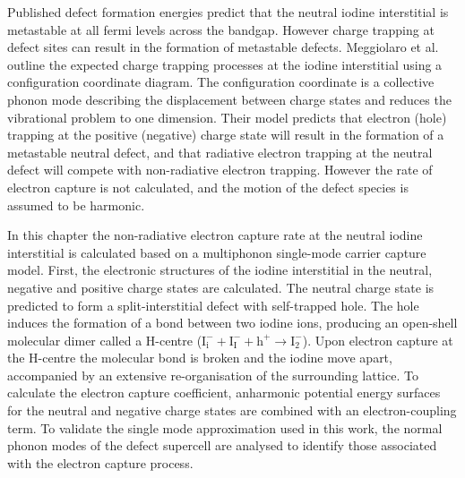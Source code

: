 Published defect formation energies predict that the neutral iodine interstitial is metastable at all fermi levels across the bandgap.\autocite{Du2015,Meggiolaro2018}
However charge trapping at defect sites can result in the formation of metastable defects.
Meggiolaro et al. outline the expected charge trapping processes at the iodine interstitial using a configuration coordinate diagram.\autocite{Meggiolaro2018}
The configuration coordinate is a collective phonon mode describing the displacement between charge states and reduces the vibrational problem to one dimension.
Their model predicts that electron (hole) trapping at the positive (negative) charge state will result in the formation of a metastable neutral defect, and that radiative electron trapping at the neutral defect will compete with non-radiative electron trapping.
However the rate of electron capture is not calculated, and the motion of the defect species is assumed to be harmonic.

In this chapter the non-radiative electron capture rate at the neutral iodine interstitial is calculated based on a multiphonon single-mode carrier capture model.  %
First, the electronic structures of the iodine interstitial in the neutral, negative and positive charge states are calculated. The neutral charge state is predicted to form a split-interstitial defect with self-trapped hole. The hole induces the formation of a bond between two iodine ions, producing an open-shell molecular dimer called a H-centre ($\mathrm{I}_\mathrm{i}^-+\mathrm{I}_\mathrm{I}^-+\mathrm{h}^+ \rightarrow \mathrm{I}_\mathrm{2}^-$).\autocite{Castner1957} Upon electron capture at the H-centre the molecular bond is broken and the iodine move apart, accompanied by an extensive re-organisation of the surrounding lattice. 
To calculate the electron capture coefficient, anharmonic potential energy surfaces for the neutral and negative charge states are combined with an electron-coupling term.
To validate the single mode approximation used in this work, the normal phonon modes of the defect supercell are analysed to identify those associated with the electron capture process.

